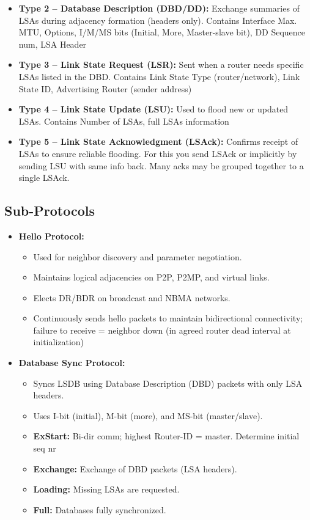 \begin{multicols*}{5}
\begin{itemize}
			\item \textbf{Type 2 – Database Description (DBD/DD):}  
			Exchange summaries of LSAs during adjacency formation (headers only). Contains Interface Max. MTU, Options, I/M/MS bits (Initial, More, Master-slave bit), DD Sequence num, LSA Header
			
			\item \textbf{Type 3 – Link State Request (LSR):}  
			Sent when a router needs specific LSAs listed in the DBD. Contains Link State Type (router/network), Link State ID, Advertising Router (sender address)
			
			\item \textbf{Type 4 – Link State Update (LSU):}  
			Used to flood new or updated LSAs. Contains Number of LSAs, full LSAs information
			
			\item \textbf{Type 5 – Link State Acknowledgment (LSAck):}  
			Confirms receipt of LSAs to ensure reliable flooding. For this you send LSAck or implicitly by sending LSU with same info back. Many acks may be grouped together to a single LSAck.
		\end{itemize}
		
		\subsection{Sub-Protocols}
		\begin{itemize}
			\item \textbf{Hello Protocol:}
			\begin{itemize}
				\item Used for neighbor discovery and parameter negotiation.
				\item Maintains logical adjacencies on P2P, P2MP, and virtual links.
				\item Elects DR/BDR on broadcast and NBMA networks.
				\item Continuously sends hello packets to maintain bidirectional connectivity; failure to receive = neighbor down (in agreed router dead interval at initialization)
			\end{itemize}
			
			\item \textbf{Database Sync Protocol:}
			\begin{itemize}
				\item Syncs LSDB using Database Description (DBD) packets with only LSA headers.
				\item Uses I-bit (initial), M-bit (more), and MS-bit (master/slave).
				\item \textbf{ExStart:} Bi-dir comm; highest Router-ID = master. Determine initial seq nr
				\item \textbf{Exchange:} Exchange of DBD packets (LSA headers).
				\item \textbf{Loading:} Missing LSAs are requested.
				\item \textbf{Full:} Databases fully synchronized.
			\end{itemize}
		\end{itemize}
		

\end{multicols*}
